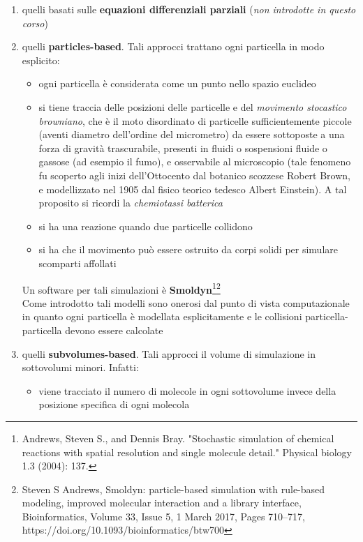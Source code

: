 \documentclass[a4paper,12pt, oneside]{book}
\begin{document}
\begin{enumerate}
  \item quelli basati sulle \textbf{equazioni differenziali parziali}
  (\textit{non introdotte in questo corso})
  \item quelli \textbf{particles-based}. Tali approcci trattano ogni particella
  in modo esplicito:
  \begin{itemize}
    \item ogni particella è considerata come un punto nello spazio euclideo
    \item si tiene traccia delle posizioni delle particelle e del
    \textit{movimento stocastico browniano}, che è il moto disordinato di
    particelle sufficientemente piccole (aventi diametro dell'ordine del
    micrometro) da essere sottoposte a una forza di gravità trascurabile,
    presenti in fluidi o sospensioni fluide o gassose (ad esempio il fumo), e
    osservabile al microscopio (tale fenomeno fu scoperto agli inizi
    dell'Ottocento dal botanico scozzese Robert Brown, e modellizzato nel
    1905 dal fisico teorico tedesco Albert Einstein). A tal proposito si ricordi
    la \textit{chemiotassi batterica}
    \item si ha una reazione quando due particelle collidono
    \item si ha che il movimento può essere ostruito da corpi solidi per
    simulare scomparti affollati
  \end{itemize}
  Un software per tali simulazioni è \textbf{Smoldyn}\footnote{Andrews, Steven
    S., and Dennis Bray. "Stochastic simulation of chemical reactions with
    spatial resolution and single molecule detail." Physical biology 1.3 (2004):
    137.}\footnote{Steven S Andrews, Smoldyn: particle-based simulation with
    rule-based modeling, improved molecular interaction and a library interface,
    Bioinformatics, Volume 33, Issue 5, 1 March 2017, Pages 710–717,
    https://doi.org/10.1093/bioinformatics/btw700} \\ 
  Come introdotto tali modelli sono onerosi dal punto di vista computazionale in
  quanto ogni particella è modellata esplicitamente e le collisioni
  particella-particella devono essere calcolate 
  \item quelli \textbf{subvolumes-based}. Tali approcci il volume di simulazione
  in sottovolumi minori. Infatti:
  \begin{itemize}
    \item viene tracciato il numero di molecole in ogni sottovolume
    invece della posizione specifica di ogni molecola

\end{itemize}
\end{enumerate}
\end{document}

